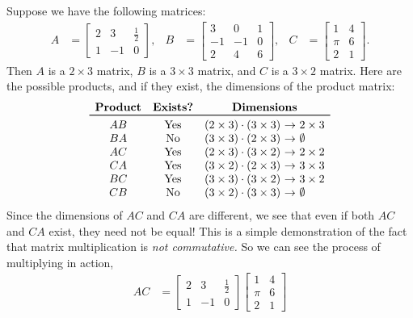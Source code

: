 \documentclass[m3380-lec-main.tex]{subfiles}
\begin{document}
\begin{exmp} Suppose we have the following matrices:
\begin{align*}
A &= \begin{bmatrix}2 & 3 & \frac12 \\ 1 & -1 & 0 \end{bmatrix}, &
B &= \begin{bmatrix}3 & 0 & 1 \\ -1 & -1 & 0 \\ 2 & 4 & 6 \end{bmatrix}, &
C &= \begin{bmatrix}1 & 4 \\ \pi & 6 \\ 2 & 1\end{bmatrix}.
\end{align*}
Then $A$ is a $2\times 3$ matrix, $B$ is a $3\times 3$ matrix, and $C$ is a $3\times 2$ matrix. Here are the possible products, and if they exist, the dimensions of the product matrix:
\[\begin{array}{ccr@{~\to~}l}
\textbf{Product} & \textbf{Exists?} & \multicolumn{2}{c}{\textbf{Dimensions}} \\ \toprule
AB & \text{Yes} & (2\times 3)\cdot(3\times 3)& 2\times 3 \\ 
BA & \text{No}  & (3\times 3)\cdot(2\times 3) & \emptyset\\
AC & \text{Yes} & (2\times 3)\cdot(3\times 2) & 2\times 2\\
CA & \text{Yes} & (3\times 2)\cdot(2\times 3) & 3\times 3\\
BC & \text{Yes} & (3\times 3)\cdot(3\times 2) & 3\times 2\\
CB & \text{No}  & (3\times 2)\cdot(3\times 3) & \emptyset \\
\end{array}\]
Since the dimensions of $AC$ and $CA$ are different, we see that even if both $AC$ and $CA$ exist, they need not be equal! This is a simple demonstration of the fact that matrix multiplication is \emph{not commutative.} So we can see the process of multiplying in action, 
\begin{align*}
AC &= 
	\begin{bmatrix}2 & 3 & \frac12 \\ 1 & -1 & 0 \end{bmatrix}
	\begin{bmatrix}1 & 4 \\ \pi & 6 \\ 2 & 1\end{bmatrix} \\

\end{align*}
\end{exmp}
\end{document}
